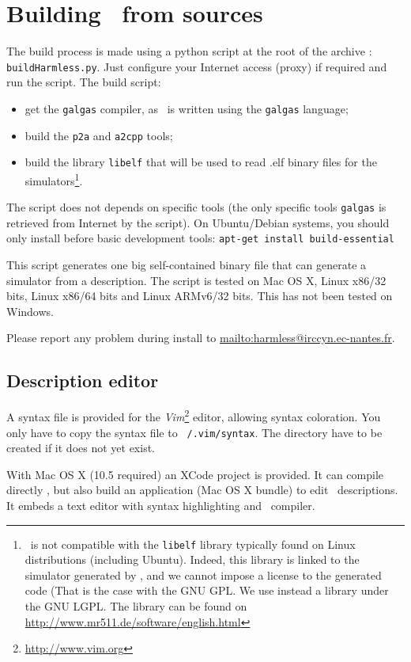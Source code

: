 \section{Building \gadl\ from sources}
The build process is made using a python script at the root of the archive : \texttt{buildHarmless.py}. Just configure your Internet access (proxy) if required and run the script. The build script:
\begin{itemize}
\item get the \texttt{galgas} compiler, as \gadl\ is written using the \texttt{galgas} language;
\item build the \texttt{p2a} and \texttt{a2cpp} tools;
\item build the library \texttt{libelf} that will be used to read .elf binary files for the simulators\footnote{\gadl\ is not compatible with the \texttt{libelf} library typically found on Linux distributions (including Ubuntu). Indeed, this library is linked to the simulator generated by \gadl, and we cannot impose a license to the generated code (That is the case with the GNU GPL. We use instead a library under the GNU LGPL. The library can be found on \url{http://www.mr511.de/software/english.html}}.
\end{itemize}

The script does not depends on specific tools (the only specific tools \texttt{galgas} is retrieved from Internet by the script). On Ubuntu/Debian systems, you should only install before basic development tools:
\texttt{apt-get install build-essential}


This script generates one big self-contained binary file that can generate a simulator from a description. The script is tested on Mac OS X, Linux x86/32 bits, Linux x86/64 bits and Linux ARMv6/32 bits. This has not been tested on Windows. 

Please report any problem during install to \url{mailto:harmless@irccyn.ec-nantes.fr}.

\subsection{Description editor}
A syntax file is provided for the \emph{Vim}\footnote{\url{http://www.vim.org}} editor, allowing syntax coloration. You only have to copy the syntax file to \texttt{~/.vim/syntax}. The directory have to be created if it does not yet exist.

With Mac OS X (10.5 required) an XCode project is provided. It can compile directly \gadl, but also build an application (Mac OS X bundle) to edit \harmless\ descriptions. It embeds a text editor with syntax highlighting and \gadl\ compiler.

